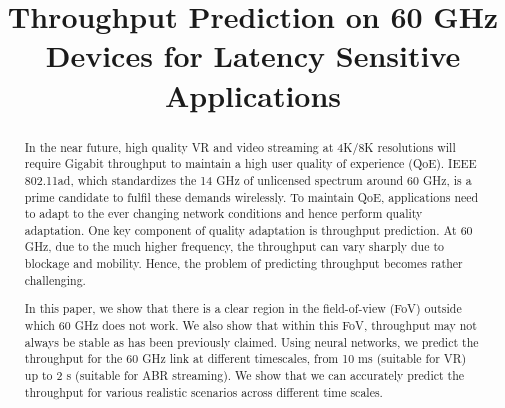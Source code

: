 \documentclass[sigconf,anonymous]{acmart}
\begin{document}
\sloppy
\title{Throughput Prediction on 60 GHz Devices for Latency Sensitive Applications}


\fancyhead{}
\renewcommand\footnotetextcopyrightpermission[1]{}
\begin{abstract}

In the near future, high quality VR and video streaming at 4K/8K resolutions will require Gigabit throughput to maintain a high user quality of experience (QoE). IEEE 802.11ad, which standardizes the 14 GHz of unlicensed spectrum around 60 GHz, is a prime candidate to fulfil these demands wirelessly. To maintain QoE, applications need to adapt to the ever changing network conditions and hence perform quality adaptation. One key component of quality adaptation is throughput prediction. At 60 GHz, due to the much higher frequency, the throughput can vary sharply due to blockage and mobility. Hence, the problem of predicting throughput becomes rather challenging.

In this paper, we show that there is a clear region in the
field-of-view (FoV) outside which 60 GHz does not work. We also show
that within this FoV, throughput may not always be stable as has been
previously claimed. Using neural networks, we predict the throughput
for the 60 GHz link at different timescales, from 10 ms (suitable for
VR) up to 2 s (suitable for ABR streaming). We show that we can 
accurately predict the throughput for various realistic scenarios
across different time scales.

\end{abstract}

\maketitle
\end{document}
